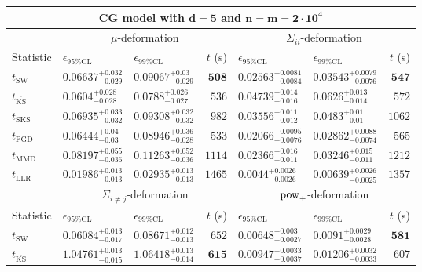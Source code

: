 \begin{tabular}{l|llr|llr}
	\toprule
	\multicolumn{7}{c}{{\bf CG model with $\mathbf{d=5}$ and $\mathbf{n=m=2\cdot 10^{4}}$}} \\
	\toprule
	\multicolumn{1}{c}{} & \multicolumn{3}{c}{$\mu$-deformation} & \multicolumn{3}{c}{$\Sigma_{ii}$-deformation} \\
	Statistic & $\epsilon_{95\%\mathrm{CL}}$ & $\epsilon_{99\%\mathrm{CL}}$ & $t$ (s) & $\epsilon_{95\%\mathrm{CL}}$ & $\epsilon_{99\%\mathrm{CL}}$ & $t$ (s) \\
	\midrule
	$t_{\mathrm{SW}}$ & $0.06637_{-0.029}^{+0.032}$ & $0.09067_{-0.029}^{+0.03}$ & ${\mathbf{508}}$ & $0.02563_{-0.0084}^{+0.0081}$ & $0.03543_{-0.0076}^{+0.0079}$ & ${\mathbf{547}}$ \\
	$t_{\overline{\mathrm{KS}}}$ & ${\mathbf{0.0604_{-0.028}^{+0.028}}}$ & ${\mathbf{0.0788_{-0.027}^{+0.026}}}$ & $536$ & $0.04739_{-0.016}^{+0.014}$ & $0.0626_{-0.014}^{+0.013}$ & $572$ \\
	$t_{\mathrm{SKS}}$ & $0.06935_{-0.032}^{+0.033}$ & $0.09308_{-0.032}^{+0.032}$ & $982$ & $0.03556_{-0.012}^{+0.011}$ & $0.0483_{-0.01}^{+0.01}$ & $1062$ \\
	$t_{\mathrm{FGD}}$ & $0.06444_{-0.03}^{+0.04}$ & $0.08946_{-0.028}^{+0.036}$ & $533$ & ${\mathbf{0.02066_{-0.0076}^{+0.0095}}}$ & ${\mathbf{0.02862_{-0.0074}^{+0.0088}}}$ & $565$ \\
	$t_{\mathrm{MMD}}$ & $0.08197_{-0.036}^{+0.055}$ & $0.11263_{-0.036}^{+0.052}$ & $1114$ & $0.02366_{-0.011}^{+0.016}$ & $0.03246_{-0.011}^{+0.015}$ & $1212$ \\
	$t_{\mathrm{LLR}}$ & $0.01986_{-0.013}^{+0.013}$ & $0.02935_{-0.013}^{+0.013}$ & $1465$ & $0.0044_{-0.0026}^{+0.0026}$ & $0.00639_{-0.0025}^{+0.0026}$ & $1357$ \\
	\toprule
	\multicolumn{1}{c}{} & \multicolumn{3}{c}{$\Sigma_{i\neq j}$-deformation} & \multicolumn{3}{c}{$\rm{pow}_{+}$-deformation} \\
	Statistic & $\epsilon_{95\%\mathrm{CL}}$ & $\epsilon_{99\%\mathrm{CL}}$ & $t$ (s) & $\epsilon_{95\%\mathrm{CL}}$ & $\epsilon_{99\%\mathrm{CL}}$ & $t$ (s) \\
	\midrule
	$t_{\mathrm{SW}}$ & $0.06084_{-0.017}^{+0.013}$ & $0.08671_{-0.013}^{+0.012}$ & $652$ & $0.00648_{-0.0027}^{+0.003}$ & $0.0091_{-0.0028}^{+0.0029}$ & ${\mathbf{581}}$ \\
	$t_{\overline{\mathrm{KS}}}$ & $1.04761_{-0.015}^{+0.013}$ & $1.06418_{-0.014}^{+0.013}$ & ${\mathbf{615}}$ & $0.00947_{-0.0037}^{+0.0033}$ & $0.01206_{-0.0033}^{+0.0032}$ & $607$ \\

\end{tabular}
